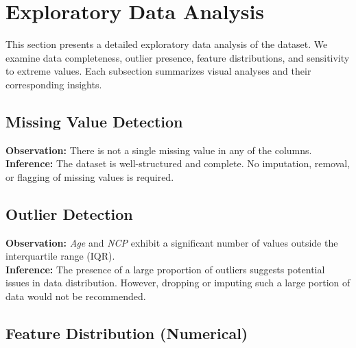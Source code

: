 \chapter{Exploratory Data Analysis}\label{ch:exploratory-data-analysis}

This section presents a detailed exploratory data analysis of the dataset.
We examine data completeness, outlier presence, feature distributions, and sensitivity to extreme values.
Each subsection summarizes visual analyses and their corresponding insights.



\section{Missing Value Detection}\label{sec:missing-value-detection}
\textbf{Observation:} There is not a single missing value in any of the columns.\\
\textbf{Inference:} The dataset is well-structured and complete.
No imputation, removal, or flagging of missing values is required.



\section{Outlier Detection}\label{sec:outlier-detection}
\textbf{Observation:} \textit{Age} and \textit{NCP} exhibit a significant number of values outside the interquartile range (IQR).\\
\textbf{Inference:} The presence of a large proportion of outliers suggests potential issues in data distribution.
However, dropping or imputing such a large portion of data would not be recommended.



\section{Feature Distribution (Numerical)}\label{sec:feature-distribution-numerical}

